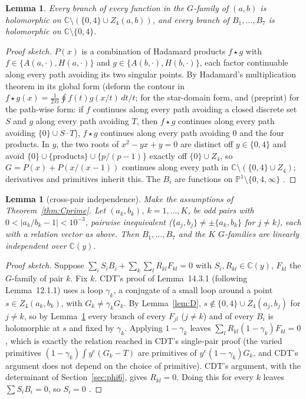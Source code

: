 \documentclass[11pt]{amsart}
\newtheorem{lemma}[proposition]{Lemma}
\theoremstyle{definition}
\theoremstyle{remark}
\numberwithin{equation}{section}
\newcommand{\CC}{\mathbb{C}}
\begin{document}
\begin{lemma}\label{lem:H}
Every branch of every function in the $G$-family of $(a,b)$ is holomorphic on $\CC\setminus(\{0,4\}\cup Z_4(a,b))$, and
every branch of $B_1,\dots,B_7$ is holomorphic on $\CC\setminus\{0,4\}$.
\end{lemma}

\begin{proof}[Proof sketch]
$P(x)$ is a combination of Hadamard products $f\star g$ with $f\in\{A(a,\cdot),H(a,\cdot)\}$ and
$g\in\{A(b,\cdot),H(b,\cdot)\}$, each factor continuable along every path avoiding its two singular points. By
Hadamard's multiplication theorem in its global form (deform the contour in $f\star g(x)=\frac1{2\pi i}\oint
f(t)g(x/t)\,dt/t$; \cite{Had99} for the star-domain form, and \cite[Thm.~A]{LSS20} (preprint) for the path-wise form:
if $f$ continues along every path avoiding a closed discrete set $S$ and $g$ along every path avoiding $T$, then
$f\star g$ continues along every path avoiding $\{0\}\cup S\cdot T$), $f\star g$ continues along every path avoiding $0$ and the
four products. In $y$,
the two roots of $x^2-yx+y=0$ are distinct off $y\in\{0,4\}$ and avoid $\{0\}\cup\{\text{products}\}\cup\{p/(p-1)\}$
exactly off $\{0\}\cup Z_4$, so $G=P(x)+P(x/(x-1))$ continues along every path in $\CC\setminus(\{0,4\}\cup Z_4)$;
derivatives and primitives inherit this. The $B_i$ are functions on $\mathbb P^1\setminus\{0,4,\infty\}$
\cite[\S10]{CDT}.
\end{proof}

\begin{lemma}[cross-pair independence]\label{lem:X}
Make the assumptions of Theorem~\ref{thm:Cprime}. Let $(a_k,b_k)$, $k=1,\dots,K$, be odd pairs with
$0<|a_k/b_k-1|<10^{-3}$, pairwise inequivalent ($\{a_j,b_j\}\ne\pm\{a_k,b_k\}$ for $j\ne k$), each with a relation
vector as above. Then $B_1,\dots,B_7$ and the $K$ $G$-families are linearly independent over $\CC(y)$.
\end{lemma}

\begin{proof}[Proof sketch]
Suppose $\sum_iS_iB_i+\sum_k\sum_lR_{kl}F_{kl}=0$ with $S_i,R_{kl}\in\CC(y)$, $F_{kl}$ the $G$-family of pair $k$. Fix $k$.
CDT's proof of Lemma~14.3.1 (following Lemma~12.1.1) uses a loop $\gamma_k$, a conjugate of a small loop around a point
$s\in Z_4(a_k,b_k)$, with $G_k\ne\gamma_kG_k$. By Lemma~\ref{lem:D}, $s\notin\{0,4\}\cup Z_4(a_j,b_j)$ for $j\ne k$, so by
Lemma~\ref{lem:H} every branch of every $F_{jl}$ ($j\ne k$) and of every $B_i$ is holomorphic at $s$ and fixed by
$\gamma_k$. Applying $1-\gamma_k$ leaves $\sum_lR_{kl}(1-\gamma_k)F_{kl}=0$, which is exactly the relation reached in
CDT's single-pair proof (the varied primitives $(1-\gamma_k)\int y^e(G_k-T)$ are primitives of $y^e(1-\gamma_k)G_k$,
and CDT's argument does not depend on the choice of primitive). CDT's argument, with the determinant of
Section~\ref{sec:phi6}, gives $R_{kl}=0$. Doing this for every $k$ leaves $\sum S_iB_i=0$, so $S_i=0$
\cite[Lemma~12.0.1]{CDT}.
\end{proof}
\end{document}
